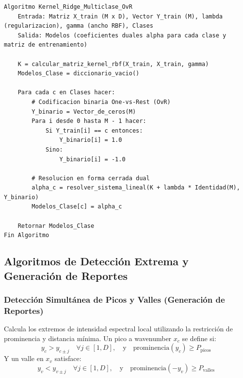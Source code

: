 \begin{lstlisting}[caption=Entrenamiento y Prediccion de Clasificador Kernel Ridge Multiclase]
Algoritmo Kernel_Ridge_Multiclase_OvR
    Entrada: Matriz X_train (M x D), Vector Y_train (M), lambda (regularizacion), gamma (ancho RBF), Clases
    Salida: Modelos (coeficientes duales alpha para cada clase y matriz de entrenamiento)

    K = calcular_matriz_kernel_rbf(X_train, X_train, gamma)
    Modelos_Clase = diccionario_vacio()
    
    Para cada c en Clases hacer:
        # Codificacion binaria One-vs-Rest (OvR)
        Y_binario = Vector_de_ceros(M)
        Para i desde 0 hasta M - 1 hacer:
            Si Y_train[i] == c entonces:
                Y_binario[i] = 1.0
            Sino:
                Y_binario[i] = -1.0
                
        # Resolucion en forma cerrada dual
        alpha_c = resolver_sistema_lineal(K + lambda * Identidad(M), Y_binario)
        Modelos_Clase[c] = alpha_c
        
    Retornar Modelos_Clase
Fin Algoritmo
\end{lstlisting}

\subsection{Algoritmos de Detección Extrema y Generación de Reportes}

\subsubsection{Detección Simultánea de Picos y Valles (Generación de Reportes)}
Calcula los extremos de intensidad espectral local utilizando la restricción de prominencia y distancia mínima. Un pico a wavenumber $x_c$ se define si:
\begin{equation}
    y_c > y_{c \pm j} \quad \forall j \in [1, D], \quad \text{y} \quad \text{prominencia}(y_c) \ge P_{\text{picos}}
\end{equation}
Y un valle en $x_v$ satisface:
\begin{equation}
    y_v < y_{v \pm j} \quad \forall j \in [1, D], \quad \text{y} \quad \text{prominencia}(-y_v) \ge P_{\text{valles}}
\end{equation}

